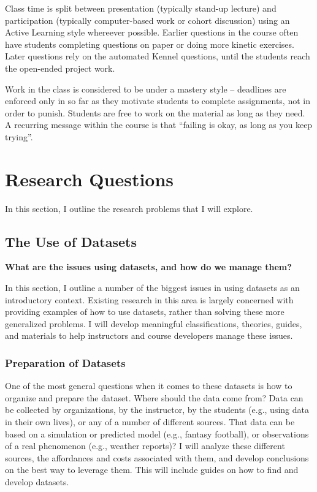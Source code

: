 Class time is split between presentation (typically stand-up lecture) and participation (typically computer-based work or cohort discussion) using an Active Learning style whereever possible.
Earlier questions in the course often have students completing questions on paper or doing more kinetic exercises.
Later questions rely on the automated Kennel questions, until the students reach the open-ended project work.

Work in the class is considered to be under a mastery style -- deadlines are enforced only in so far as they motivate students to complete assignments, not in order to punish.
Students are free to work on the material as long as they need.
A recurring message within the course is that ``failing is okay, as long as you keep trying''.

\section{Research Questions}

In this section, I outline the research problems that I will explore.

\subsection{The Use of Datasets}

\textbf{What are the issues using datasets, and how do we manage them?}

In this section, I outline a number of the biggest issues in using datasets as an introductory context.
Existing research in this area is largely concerned with providing examples of how to use datasets, rather than solving these more generalized problems.
I will develop meaningful classifications, theories, guides, and materials to help instructors and course developers manage these issues.

\subsubsection{Preparation of Datasets}

One of the most general questions when it comes to these datasets is how to organize and prepare the dataset. Where should the data come from? Data can be collected by organizations, by the instructor, by the students (e.g., using data in their own lives), or any of a number of different sources. That data can be based on a simulation or predicted model (e.g., fantasy football), or observations of a real phenomenon (e.g., weather reports)? I will analyze these different sources, the affordances and costs associated with them, and develop conclusions on the best way to leverage them. This will include guides on how to find and develop datasets.

